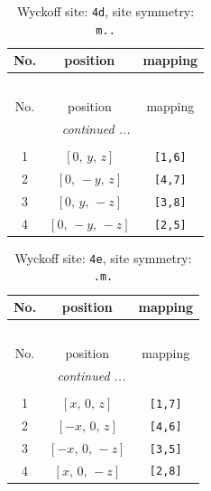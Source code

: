 \documentclass[fleqn,8pt]{jsarticle}
\begin{document}
\begin{longtable}{ccc}
\caption{Wyckoff site: {\tt 4d}, site symmetry: {\tt m..}}
 \\
 \hline \hline
No. & position & mapping \\ \hline \endfirsthead

\multicolumn{2}{l}{\tablename\ \thetable{}} \\
 \hline \hline
No. & position & mapping \\ \hline \endhead

 \hline \hline
\multicolumn{2}{r}{\footnotesize\it continued ...} \\ \endfoot

 \hline \hline
\multicolumn{2}{r}{} \\ \endlastfoot

1 & $\left[ 0,\, y,\, z \right]$ & {\tt [1,6]} \\ \hline
2 & $\left[ 0,\, - y,\, z \right]$ & {\tt [4,7]} \\ \hline
3 & $\left[ 0,\, y,\, - z \right]$ & {\tt [3,8]} \\ \hline
4 & $\left[ 0,\, - y,\, - z \right]$ & {\tt [2,5]} \\
\end{longtable}
\renewcommand{\arraystretch}{1.2}
\begin{longtable}{ccc}
\caption{Wyckoff site: {\tt 4e}, site symmetry: {\tt .m.}}
 \\
 \hline \hline
No. & position & mapping \\ \hline \endfirsthead

\multicolumn{2}{l}{\tablename\ \thetable{}} \\
 \hline \hline
No. & position & mapping \\ \hline \endhead

 \hline \hline
\multicolumn{2}{r}{\footnotesize\it continued ...} \\ \endfoot

 \hline \hline
\multicolumn{2}{r}{} \\ \endlastfoot

1 & $\left[ x,\, 0,\, z \right]$ & {\tt [1,7]} \\ \hline
2 & $\left[ - x,\, 0,\, z \right]$ & {\tt [4,6]} \\ \hline
3 & $\left[ - x,\, 0,\, - z \right]$ & {\tt [3,5]} \\ \hline
4 & $\left[ x,\, 0,\, - z \right]$ & {\tt [2,8]} \\
\end{longtable}
\renewcommand{\arraystretch}{1.2}
\end{document}
